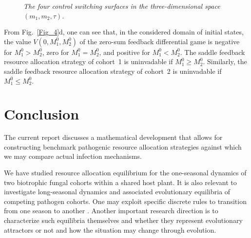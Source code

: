 \documentclass[11pt]{amsart}
\begin{document}
\begin{figure}
\bf \caption{\it The four control switching surfaces in the three-dimensional
space~$ (m_1, m_2, \tau) $.}
\label{Fig_7}
\end{figure}

From Fig.~{\rm \ref{Fig_4}d,} one can see that{\rm ,} in the considered domain
of initial states{\rm ,} the value $ V \left( 0, M_1^0, M_2^0 \right) $ of
the zero-sum feedback differential game is negative for $ M_1^0 > M_2^0 ${\rm ,}
zero for $ M_1^0 = M_2^0 ${\rm ,} and positive for $ M_1^0 < M_2^0 $. The
saddle feedback resource allocation strategy of cohort~{\rm 1} is uninvadable
if $ M_1^0 \geqslant M_2^0 $. Similarly{\rm ,} the saddle feedback resource
allocation strategy of cohort~{\rm 2} is uninvadable if $ M_1^0
\leqslant M_2^0 $.


\section{Conclusion}

The current report discusses a mathematical development that allows for
constructing benchmark pathogenic resource allocation strategies against which
we may compare actual infection mechanisms.

We have studied resource allocation equilibrium for the one-seasonal dynamics
of two biotrophic fungal cohorts within a shared host plant. It is also relevant
to investigate long-seasonal dynamics and associated evolutionary equilibria of
competing pathogen cohorts. One may exploit specific discrete rules to
transition from one season to another \cite{MailleretLemesle2009,Akhmetzhanov2012}.
Another important research direction is to characterize such equilibria
themselves and whether they represent evolutionary attractors or not and how the
situation may change through evolution.
\end{document}
